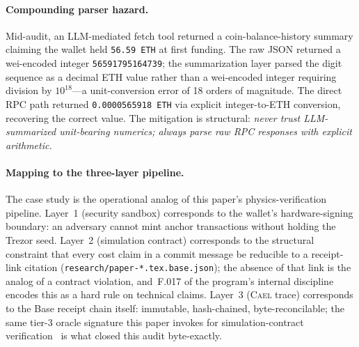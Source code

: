 \documentclass[letterpaper,twocolumn,10pt]{article}
\newcommand{\cael}{\textsc{Cael}}
\begin{document}
\paragraph{Compounding parser hazard.} Mid-audit, an LLM-mediated
fetch tool returned a coin-balance-history summary claiming the
wallet held \texttt{56.59~ETH} at first funding. The raw JSON
returned a wei-encoded integer \texttt{56591795164739}; the
summarization layer parsed the digit sequence as a decimal ETH
value rather than a wei-encoded integer requiring division by
$10^{18}$---a unit-conversion error of 18 orders of magnitude. The
direct RPC path returned \texttt{0.0000565918~ETH} via explicit
integer-to-ETH conversion, recovering the correct value. The
mitigation is structural: \emph{never trust LLM-summarized
unit-bearing numerics; always parse raw RPC responses with explicit
arithmetic.}

\paragraph{Mapping to the three-layer pipeline.} The case study is
the operational analog of this paper's physics-verification pipeline.
Layer~1 (security sandbox) corresponds to the wallet's
hardware-signing boundary: an adversary cannot mint anchor
transactions without holding the Trezor seed. Layer~2 (simulation
contract) corresponds to the structural constraint that every cost
claim in a commit message be reducible to a receipt-link citation
(\texttt{research/paper-*.tex.base.json}); the absence of that link
is the analog of a contract violation, and~F.017 of the program's
internal discipline encodes this as a hard rule on technical claims.
Layer~3 (\cael{} trace) corresponds to the Base receipt chain itself:
immutable, hash-chained, byte-reconcilable; the same tier-3 oracle
signature this paper invokes for simulation-contract
verification~\cite{w-gold-013-trust-by-construction} is what closed
this audit byte-exactly.
\end{document}

